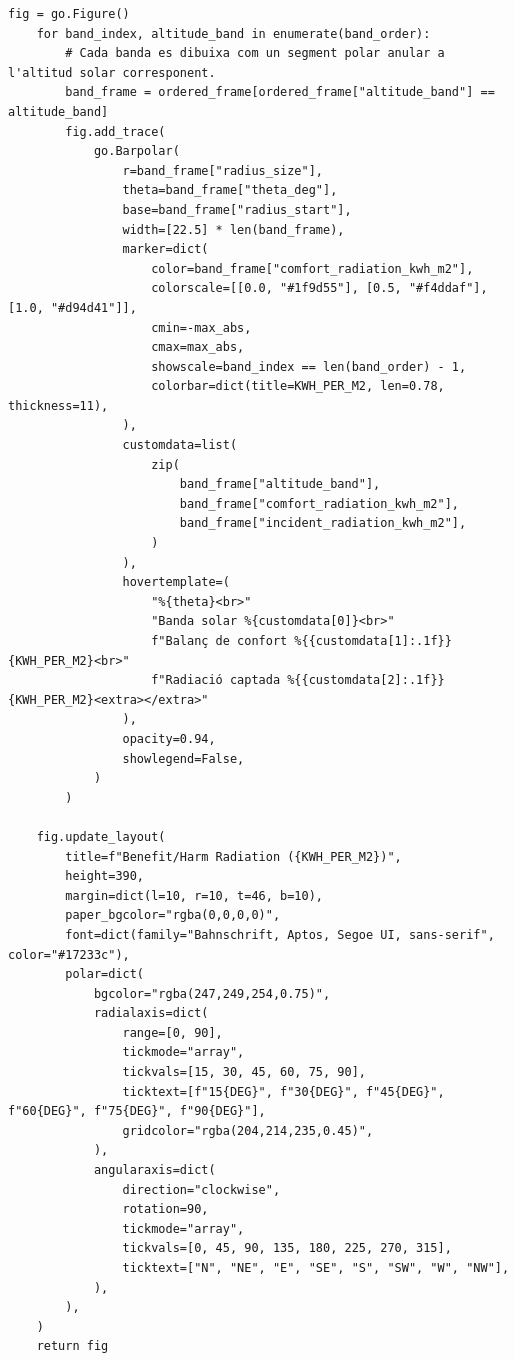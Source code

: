 \documentclass[10pt,a4paper]{article}
\begin{document}
\begin{lstlisting}[style=studioPython,caption={backend/epw\_figures.py},label={lst:backend-epw-figures-py}]
    fig = go.Figure()
    for band_index, altitude_band in enumerate(band_order):
        # Cada banda es dibuixa com un segment polar anular a l'altitud solar corresponent.
        band_frame = ordered_frame[ordered_frame["altitude_band"] == altitude_band]
        fig.add_trace(
            go.Barpolar(
                r=band_frame["radius_size"],
                theta=band_frame["theta_deg"],
                base=band_frame["radius_start"],
                width=[22.5] * len(band_frame),
                marker=dict(
                    color=band_frame["comfort_radiation_kwh_m2"],
                    colorscale=[[0.0, "#1f9d55"], [0.5, "#f4ddaf"], [1.0, "#d94d41"]],
                    cmin=-max_abs,
                    cmax=max_abs,
                    showscale=band_index == len(band_order) - 1,
                    colorbar=dict(title=KWH_PER_M2, len=0.78, thickness=11),
                ),
                customdata=list(
                    zip(
                        band_frame["altitude_band"],
                        band_frame["comfort_radiation_kwh_m2"],
                        band_frame["incident_radiation_kwh_m2"],
                    )
                ),
                hovertemplate=(
                    "%{theta}<br>"
                    "Banda solar %{customdata[0]}<br>"
                    f"Balanç de confort %{{customdata[1]:.1f}} {KWH_PER_M2}<br>"
                    f"Radiació captada %{{customdata[2]:.1f}} {KWH_PER_M2}<extra></extra>"
                ),
                opacity=0.94,
                showlegend=False,
            )
        )

    fig.update_layout(
        title=f"Benefit/Harm Radiation ({KWH_PER_M2})",
        height=390,
        margin=dict(l=10, r=10, t=46, b=10),
        paper_bgcolor="rgba(0,0,0,0)",
        font=dict(family="Bahnschrift, Aptos, Segoe UI, sans-serif", color="#17233c"),
        polar=dict(
            bgcolor="rgba(247,249,254,0.75)",
            radialaxis=dict(
                range=[0, 90],
                tickmode="array",
                tickvals=[15, 30, 45, 60, 75, 90],
                ticktext=[f"15{DEG}", f"30{DEG}", f"45{DEG}", f"60{DEG}", f"75{DEG}", f"90{DEG}"],
                gridcolor="rgba(204,214,235,0.45)",
            ),
            angularaxis=dict(
                direction="clockwise",
                rotation=90,
                tickmode="array",
                tickvals=[0, 45, 90, 135, 180, 225, 270, 315],
                ticktext=["N", "NE", "E", "SE", "S", "SW", "W", "NW"],
            ),
        ),
    )
    return fig



\end{lstlisting}
\end{document}
